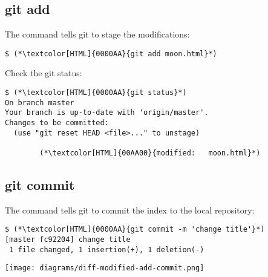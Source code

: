 \subsection{git add}
\begin{frame}[fragile]
  \subslidetitle

  The command  tells git to stage the modifications:
  \begin{lstlisting}
$ (*\textcolor[HTML]{0000AA}{git add moon.html}*)
  \end{lstlisting}

  Check the git status:
  \begin{lstlisting}
$ (*\textcolor[HTML]{0000AA}{git status}*)
On branch master
Your branch is up-to-date with 'origin/master'.
Changes to be committed:
  (use "git reset HEAD <file>..." to unstage)

        (*\textcolor[HTML]{00AA00}{modified:   moon.html}*)
  \end{lstlisting}
\end{frame}

\subsection{git commit}
\begin{frame}[fragile]
  \subslidetitle

  The command  tells git to commit the index to the local repository:
  \begin{lstlisting}
$ (*\textcolor[HTML]{0000AA}{git commit -m 'change title'}*)
[master fc92204] change title
 1 file changed, 1 insertion(+), 1 deletion(-)
\end{lstlisting}

  \vspace{1cm}
  \texttt{[image: diagrams/diff-modified-add-commit.png]}
\end{frame}
